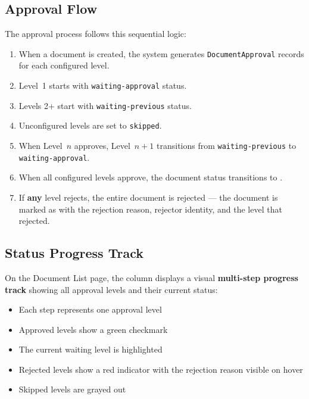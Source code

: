 \subsection{Approval Flow}

The approval process follows this sequential logic:

\begin{enumerate}[leftmargin=18pt]
  \item When a document is created, the system generates
        \texttt{DocumentApproval} records for each configured
        level.
  \item Level~1 starts with
        \texttt{waiting-approval} status.
  \item Levels 2+ start with
        \texttt{waiting-previous} status.
  \item Unconfigured levels are set to
        \texttt{skipped}.
  \item When Level~$n$ approves, Level~$n+1$ transitions
        from \texttt{waiting-previous} to
        \texttt{waiting-approval}.
  \item When all configured levels approve, the document
        status transitions to
        .
  \item If \textbf{any} level rejects, the entire document
        is rejected --- the document is marked as
         with the rejection
        reason, rejector identity, and the level that rejected.
\end{enumerate}

\subsection{Status Progress Track}

On the Document List page, the  column displays
a visual \textbf{multi-step progress track} showing all
approval levels and their current status:

\begin{itemize}[leftmargin=18pt]
  \item Each step represents one approval level
  \item Approved levels show a green checkmark
  \item The current waiting level is highlighted
  \item Rejected levels show a red indicator with the
        rejection reason visible on hover
  \item Skipped levels are grayed out
\end{itemize}

